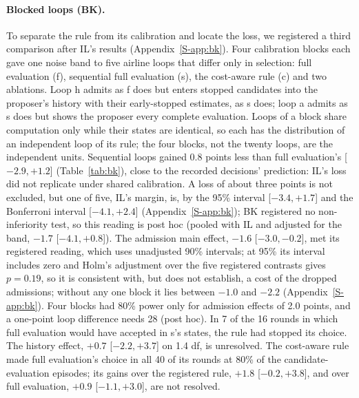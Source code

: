 \documentclass[11pt]{article}
\begin{document}
\paragraph{Blocked loops (BK).} To separate the rule from its calibration and locate the loss, we registered a third comparison after IL's results (Appendix~\ref*{S-app:bk}). Four calibration blocks each gave one noise band to five airline loops that differ only in selection: full evaluation (f), sequential full evaluation (s), the cost-aware rule (c) and two ablations. Loop h admits as f does but enters stopped candidates into the proposer's history with their early-stopped estimates, as s does; loop a admits as s does but shows the proposer every complete evaluation. Loops of a block share computation only while their states are identical, so each has the distribution of an independent loop of its rule; the four blocks, not the twenty loops, are the independent units. Sequential loops gained 0.8 points less than full evaluation's [$-2.9,+1.2$] (Table~\ref{tab:bk}), close to the recorded decisions' prediction: IL's loss did not replicate under shared calibration. A loss of about three points is not excluded, but one of five, IL's margin, is, by the 95\% interval [$-3.4,+1.7$] and the Bonferroni interval [$-4.1,+2.4$] (Appendix~\ref*{S-app:bk}); BK registered no non-inferiority test, so this reading is post hoc (pooled with IL and adjusted for the band, $-1.7$ [$-4.1,+0.8$]). The admission main effect, $-1.6$ [$-3.0,-0.2$], met its registered reading, which uses unadjusted 90\% intervals; at 95\% its interval includes zero and Holm's adjustment over the five registered contrasts gives $p=0.19$, so it is consistent with, but does not establish, a cost of the dropped admissions; without any one block it lies between $-1.0$ and $-2.2$ (Appendix~\ref*{S-app:bk}). Four blocks had 80\% power only for admission effects of 2.0 points, and a one-point loop difference needs 28 (post hoc). In 7 of the 16 rounds in which full evaluation would have accepted in s's states, the rule had stopped its choice. The history effect, $+0.7$ [$-2.2,+3.7$] on 1.4 df, is unresolved. The cost-aware rule made full evaluation's choice in all 40 of its rounds at 80\% of the candidate-evaluation episodes; its gains over the registered rule, $+1.8$ [$-0.2,+3.8$], and over full evaluation, $+0.9$ [$-1.1,+3.0$], are not resolved.
\end{document}
